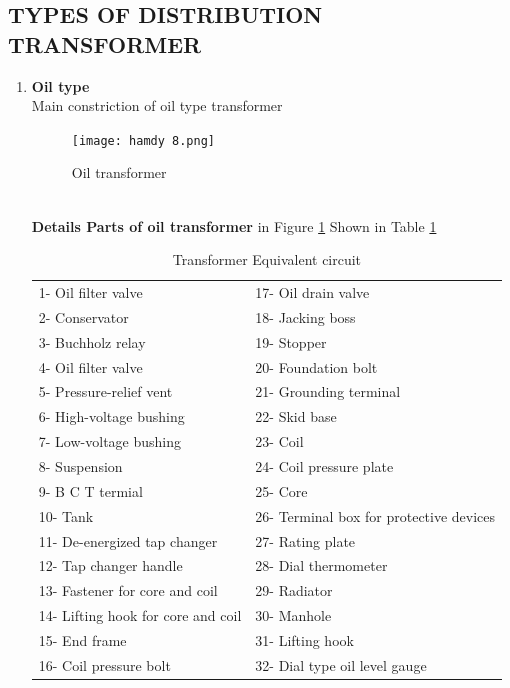 \documentclass[12pt,fleqn]{book} %
\begin{document}
\subsection{TYPES OF DISTRIBUTION TRANSFORMER}
\begin{enumerate}
\item \textbf {Oil type }
       \\ Main constriction of oil type transformer
       \begin{figure}[h!]
    \centering
    \texttt{[image: hamdy 8.png]}
    \caption{Oil transformer}
    \label{fig:hamdy 8}
\end{figure}
\\ \textbf {Details Parts of oil transformer} in Figure \ref{fig:hamdy 8} Shown in Table \ref{tab:Transformer Equivalent circuit}
\begin{table}[h!]
\centering
\caption{Transformer Equivalent circuit }
\label{tab:Transformer Equivalent circuit}%
\begin{tabular}{ll}
1- Oil filter valve                & 17- Oil drain valve                      \\
2- Conservator                     & 18- Jacking boss                         \\
3- Buchholz relay                  & 19- Stopper                              \\
4- Oil filter valve                & 20- Foundation bolt                      \\
5- Pressure-relief vent            & 21- Grounding terminal                   \\
6- High-voltage bushing            & 22- Skid base                            \\
7- Low-voltage bushing             & 23- Coil                                 \\
8- Suspension~ ~                   & 24- Coil pressure plate                  \\
9- B C T termial                   & 25- Core                                 \\
10- Tank                           & 26- Terminal box for protective devices  \\
11- De-energized tap changer       & 27- Rating plate                         \\
12- Tap changer handle             & 28- Dial thermometer                     \\
13- Fastener for core and coil     & 29- Radiator                             \\
14- Lifting hook for core and coil & 30- Manhole                              \\
15- End frame                      & 31- Lifting hook                         \\
16- Coil pressure bolt             & 32- Dial type oil level gauge           
\end{tabular}
  

\end{table}
\end{enumerate}
\end{document}
